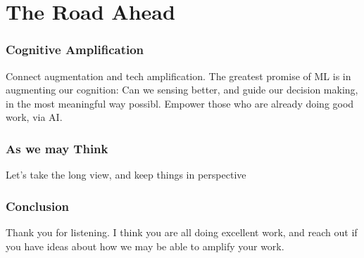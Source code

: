 \documentclass[10pt,mathserif]{beamer}
\begin{document}
\section{The Road Ahead}
\label{sec:label}

\begin{frame}
  \frametitle{Cognitive Amplification}
  Connect augmentation and tech amplification.
  The greatest promise of ML is in augmenting our cognition: Can we sensing
  better, and guide our decision making, in the most meaningful way possibl.
  Empower those who are already doing good work, via AI.
\end{frame}

\begin{frame}
  \frametitle{As we may Think}
  Let's take the long view, and keep things in perspective
\end{frame}

\begin{frame}
  \frametitle{Conclusion}
  Thank you for listening. I think you are all doing excellent work, and reach
  out if you have ideas about how we may be able to amplify your work.
\end{frame}



\end{document}
